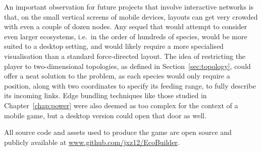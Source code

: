 An important observation for future projects that involve interactive networks is that, on the small vertical screens of mobile devices, layouts can get very crowded with even a couple of dozen nodes.
Any sequel that would attempt to consider even larger ecosystems, i.e.\ in the order of hundreds of species, would be more suited to a desktop setting, and would likely require a more specialised visualisation than a standard force-directed layout.
The idea of restricting the player to two-dimensional topologies, as defined in Section~\ref{sec:topology}, could offer a neat solution to the problem, as each species would only require a position, along with two coordinates to specify its feeding range, to fully describe its incoming links.
Edge bundling techniques like those studied in Chapter~\ref{chap:power} were also deemed as too complex for the context of a mobile game, but a desktop version could open that door as well.

All source code and assets used to produce the game are open source and publicly available at \url{www.github.com/jxz12/EcoBuilder}.